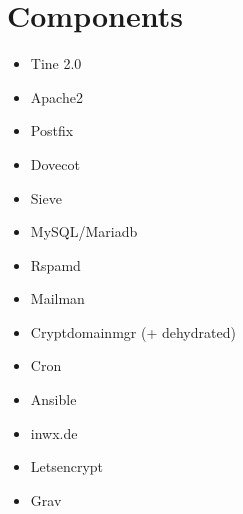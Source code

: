 \documentclass{beamer}
\begin{document}
\section{Components}
	\begin{frame}{\insertsection}{\insertsubsection}
		\vspace{-0.5cm}
		
		\begin{itemize}
			\item Tine 2.0
			\item Apache2
			\item Postfix
			\item Dovecot
			\item Sieve
			\item MySQL/Mariadb
			\item Rspamd
			\item Mailman
			\item Cryptdomainmgr (+ dehydrated)
			\item Cron
			\item Ansible
			\item inwx.de
			\item Letsencrypt
			\item Grav
		\end{itemize}
	\end{frame}
\end{document}
